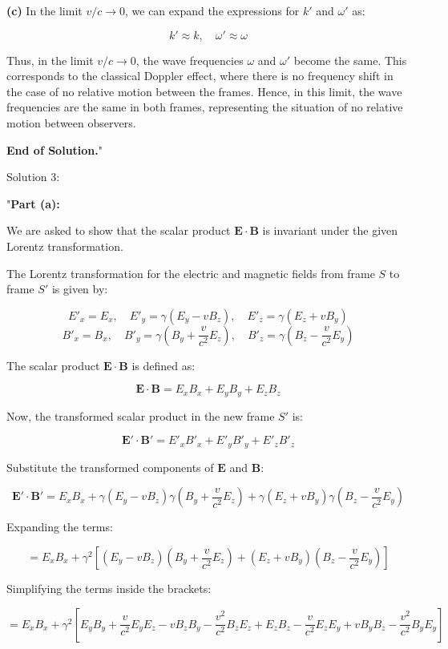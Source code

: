 \textbf{(c)} In the limit \( v / c \to 0 \), we can expand the expressions for \( k' \) and \( \omega' \) as:

\[
k' \approx k, \quad \omega' \approx \omega
\]

Thus, in the limit \( v / c \to 0 \), the wave frequencies \( \omega \) and \( \omega' \) become the same. This corresponds to the classical Doppler effect, where there is no frequency shift in the case of no relative motion between the frames. Hence, in this limit, the wave frequencies are the same in both frames, representing the situation of no relative motion between observers.

\textbf{End of Solution.}"

Solution 3:

"\textbf{Part (a):} 

We are asked to show that the scalar product \( \mathbf{E} \cdot \mathbf{B} \) is invariant under the given Lorentz transformation.

The Lorentz transformation for the electric and magnetic fields from frame \( S \) to frame \( S' \) is given by:

\[
E'_x = E_x, \quad E'_y = \gamma (E_y - v B_z), \quad E'_z = \gamma (E_z + v B_y)
\]
\[
B'_x = B_x, \quad B'_y = \gamma \left( B_y + \frac{v}{c^2} E_z \right), \quad B'_z = \gamma \left( B_z - \frac{v}{c^2} E_y \right)
\]

The scalar product \( \mathbf{E} \cdot \mathbf{B} \) is defined as:

\[
\mathbf{E} \cdot \mathbf{B} = E_x B_x + E_y B_y + E_z B_z
\]

Now, the transformed scalar product in the new frame \( S' \) is:

\[
\mathbf{E'} \cdot \mathbf{B'} = E'_x B'_x + E'_y B'_y + E'_z B'_z
\]

Substitute the transformed components of \( \mathbf{E} \) and \( \mathbf{B} \):

\[
\mathbf{E'} \cdot \mathbf{B'} = E_x B_x + \gamma (E_y - v B_z) \gamma \left( B_y + \frac{v}{c^2} E_z \right) + \gamma (E_z + v B_y) \gamma \left( B_z - \frac{v}{c^2} E_y \right)
\]

Expanding the terms:

\[
= E_x B_x + \gamma^2 \left[ (E_y - v B_z) (B_y + \frac{v}{c^2} E_z) + (E_z + v B_y) (B_z - \frac{v}{c^2} E_y) \right]
\]

Simplifying the terms inside the brackets:

\[
= E_x B_x + \gamma^2 \left[ E_y B_y + \frac{v}{c^2} E_y E_z - v B_z B_y - \frac{v^2}{c^2} B_z E_z + E_z B_z - \frac{v}{c^2} E_z E_y + v B_y B_z - \frac{v^2}{c^2} B_y E_y \right]
\]

